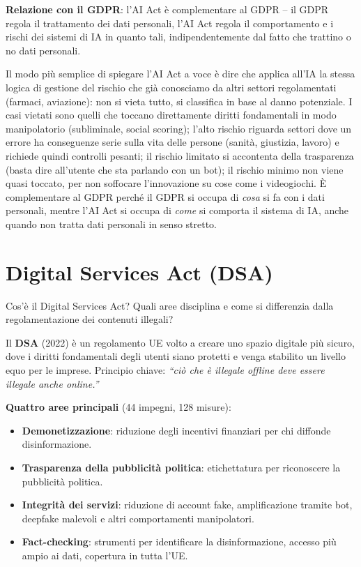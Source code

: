 \documentclass[a4paper,11pt]{article}
\begin{document}
\textbf{Relazione con il GDPR}: l'AI Act \`{e} complementare al GDPR -- il GDPR regola il trattamento dei dati personali, l'AI Act regola il comportamento e i rischi dei sistemi di IA in quanto tali, indipendentemente dal fatto che trattino o no dati personali.

\begin{nota}
Il modo pi\`{u} semplice di spiegare l'AI Act a voce \`{e} dire che applica all'IA la stessa logica di gestione del rischio che gi\`{a} conosciamo da altri settori regolamentati (farmaci, aviazione): non si vieta tutto, si classifica in base al danno potenziale. I casi vietati sono quelli che toccano direttamente diritti fondamentali in modo manipolatorio (subliminale, social scoring); l'alto rischio riguarda settori dove un errore ha conseguenze serie sulla vita delle persone (sanit\`{a}, giustizia, lavoro) e richiede quindi controlli pesanti; il rischio limitato si accontenta della trasparenza (basta dire all'utente che sta parlando con un bot); il rischio minimo non viene quasi toccato, per non soffocare l'innovazione su cose come i videogiochi. \`{E} complementare al GDPR perch\'{e} il GDPR si occupa di \emph{cosa} si fa con i dati personali, mentre l'AI Act si occupa di \emph{come} si comporta il sistema di IA, anche quando non tratta dati personali in senso stretto.
\end{nota}

\section{Digital Services Act (DSA)}

\begin{domanda}
Cos'\`{e} il Digital Services Act? Quali aree disciplina e come si differenzia dalla regolamentazione dei contenuti illegali?
\end{domanda}

Il \textbf{DSA} (2022) \`{e} un regolamento UE volto a creare uno spazio digitale pi\`{u} sicuro, dove i diritti fondamentali degli utenti siano protetti e venga stabilito un livello equo per le imprese. Principio chiave: \emph{``ci\`{o} che \`{e} illegale offline deve essere illegale anche online.''}

\textbf{Quattro aree principali} (44 impegni, 128 misure):
\begin{itemize}
  \item \textbf{Demonetizzazione}: riduzione degli incentivi finanziari per chi diffonde disinformazione.
  \item \textbf{Trasparenza della pubblicit\`{a} politica}: etichettatura per riconoscere la pubblicit\`{a} politica.
  \item \textbf{Integrit\`{a} dei servizi}: riduzione di account fake, amplificazione tramite bot, deepfake malevoli e altri comportamenti manipolatori.
  \item \textbf{Fact-checking}: strumenti per identificare la disinformazione, accesso pi\`{u} ampio ai dati, copertura in tutta l'UE.
\end{itemize}
\end{document}
